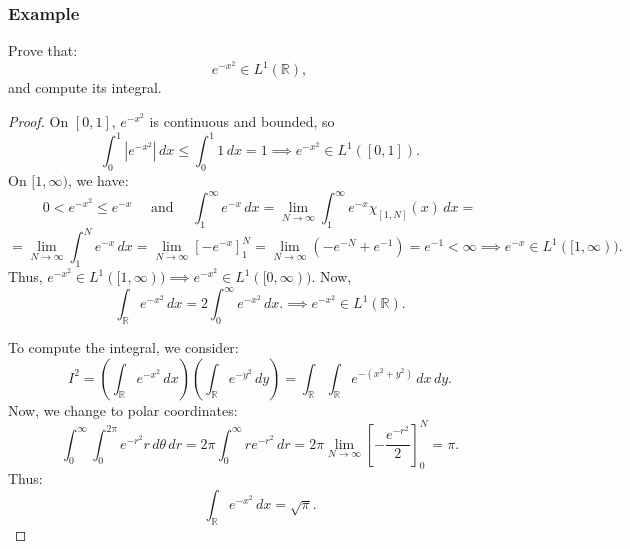 \documentclass[11pt]{article}
\begin{document}
\subsubsection*{Example}
Prove that:
\[e^{-x^2} \in L^1(\mathbb{R}),\]
and compute its integral.
\begin{center}
\end{center}

\begin{proof}
On \([0, 1]\), \(e^{-x^2}\) is continuous and bounded, so 
\[\int_0^1 \left|e^{-x^2}\right| \,dx \leq \int_0^1 1 \,dx = 1 \implies e^{-x^2} \in L^1([0, 1]).\]
On \([1, \infty)\), we have:
\[0 < e^{-x^2} \leq e^{-x} \quad \text{ and } \quad \int_1^{\infty} e^{-x} \,dx = \lim_{N \to \infty} \int_1^{\infty} e^{-x} \chi_{[1, N]}(x) \,dx = \]
\[= \lim_{N \to \infty} \int_1^{N} e^{-x} \,dx = \lim_{N \to \infty} \left[-e^{-x}\right]_1^{N} = \lim_{N \to \infty} \left(-e^{-N} + e^{-1}\right) = e^{-1} < \infty \implies e^{-x} \in L^1([1, \infty)).\]
Thus, \(e^{-x^2} \in L^1([1, \infty)) \implies e^{-x^2} \in L^1([0, \infty))\).
Now, 
\[\int_{\mathbb{R}} e^{-x^2} \,dx = 2 \int_0^{\infty} e^{-x^2} \,dx. \implies e^{-x^2} \in L^1(\mathbb{R}).\]

To compute the integral, we consider:
\[I^2 = \left(\int_{\mathbb{R}} e^{-x^2} \,dx\right) \left(\int_{\mathbb{R}} e^{-y^2} \,dy\right) = \int_{\mathbb{R}} \int_{\mathbb{R}} e^{-(x^2 + y^2)} \,dx \,dy.\]
Now, we change to polar coordinates:
\[\int_0^{\infty} \int_0^{2\pi} e^{-r^2} r \,d\theta \,dr = 2\pi \int_0^{\infty} r e^{-r^2} \,dr = 2\pi \lim_{N \to \infty}\left[-\frac{e^{-r^2}}{2}\right]_0^{N} = \pi.\]
Thus:
\[\int_{\mathbb{R}} e^{-x^2} \,dx = \sqrt{\pi}.\]
\end{proof}
\end{document}
